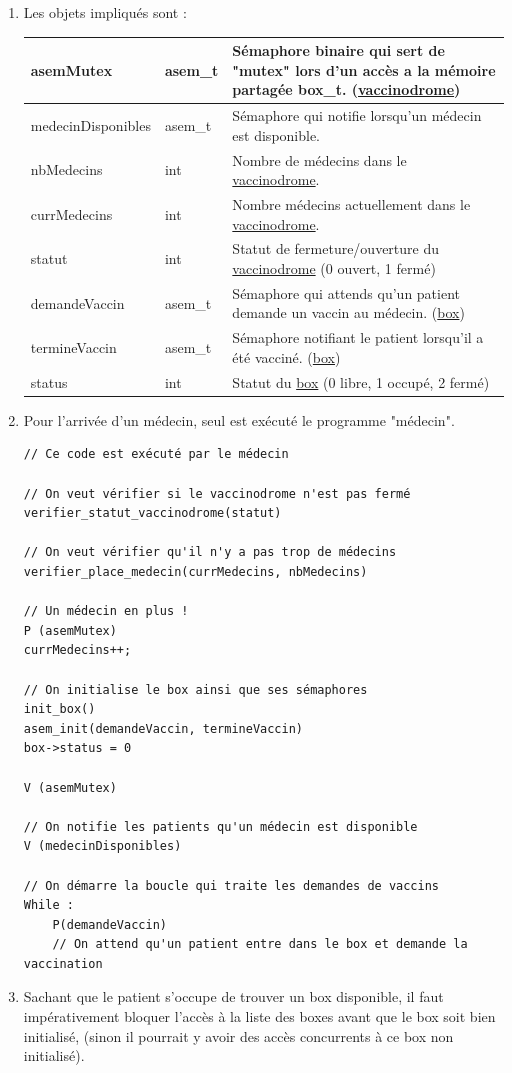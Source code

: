 \documentclass[a4paper]{article}
\begin{document}
  \begin{enumerate}
    \item Les objets impliqués sont :

    \begin{tabularx}{\linewidth}{|l|l|>{\strut}X|}
      \hline%
      asemMutex & asem\_t & Sémaphore binaire qui sert de "mutex" lors d'un accès a la mémoire partagée box\_t. (\underline{vaccinodrome}) \\ \hline%
      medecinDisponibles & asem\_t & Sémaphore qui notifie lorsqu'un médecin est disponible. \\ \hline%

      nbMedecins & int & Nombre de médecins dans le \underline{vaccinodrome}. \\ \hline%
      currMedecins & int & Nombre médecins actuellement dans le \underline{vaccinodrome}. \\ \hline%
      statut & int & Statut de fermeture/ouverture du \underline{vaccinodrome} (0 ouvert, 1 fermé) \\ \hline%

      demandeVaccin & asem\_t & Sémaphore qui attends qu'un patient demande un vaccin au médecin. (\underline{box}) \\ \hline%
      termineVaccin & asem\_t & Sémaphore notifiant le patient lorsqu'il a été vacciné. (\underline{box}) \\ \hline%
      status & int & Statut du \underline{box} (0 libre, 1 occupé, 2 fermé) \\ \hline%
    \end{tabularx}

    \item Pour l'arrivée d'un médecin, seul est exécuté le programme "médecin".

    \begin{verbatim}
// Ce code est exécuté par le médecin

// On veut vérifier si le vaccinodrome n'est pas fermé
verifier_statut_vaccinodrome(statut)

// On veut vérifier qu'il n'y a pas trop de médecins
verifier_place_medecin(currMedecins, nbMedecins)

// Un médecin en plus !
P (asemMutex)
currMedecins++;

// On initialise le box ainsi que ses sémaphores
init_box()
asem_init(demandeVaccin, termineVaccin)
box->status = 0

V (asemMutex)

// On notifie les patients qu'un médecin est disponible
V (medecinDisponibles)

// On démarre la boucle qui traite les demandes de vaccins
While :
    P(demandeVaccin)
    // On attend qu'un patient entre dans le box et demande la vaccination

    \end{verbatim}

    \item Sachant que le patient s'occupe de trouver un box disponible, il faut impérativement bloquer l'accès à la liste des boxes avant que le box soit bien initialisé, (sinon il pourrait y avoir des accès concurrents à ce box non initialisé).
  \end{enumerate}
  \newpage
\end{document}
